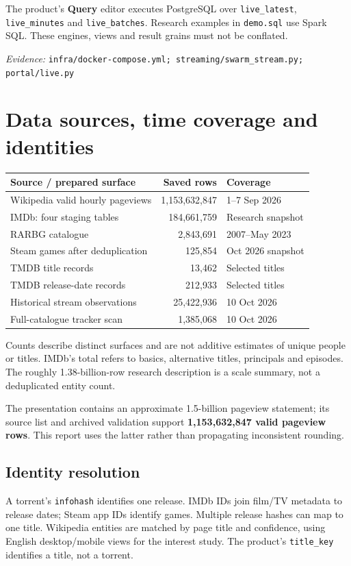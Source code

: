\documentclass[11pt,a4paper]{article}
\newcommand{\code}[1]{{\small\nolinkurl{#1}}}
\newcommand{\source}[1]{{\footnotesize\textit{Evidence:} \code{#1}\par}}
\newcommand{\chapterpage}[1]{\clearpage\section{#1}}
\begin{document}
The product's \textbf{Query} editor executes PostgreSQL over
\code{live_latest}, \code{live_minutes} and \code{live_batches}.
Research examples in \code{demo.sql} use Spark SQL. These engines, views
and result grains must not be conflated.

\source{infra/docker-compose.yml; streaming/swarm_stream.py; portal/live.py}

\chapterpage{Data sources, time coverage and identities}
\begin{tabularx}{\linewidth}{@{}Yrl@{}}
\toprule
\textbf{Source / prepared surface} & \textbf{Saved rows} & \textbf{Coverage}\\
\midrule
Wikipedia valid hourly pageviews & 1,153,632,847 & 1--7 Sep 2026\\
IMDb: four staging tables & 184,661,759 & Research snapshot\\
RARBG catalogue & 2,843,691 & 2007--May 2023\\
Steam games after deduplication & 125,854 & Oct 2026 snapshot\\
TMDB title records & 13,462 & Selected titles\\
TMDB release-date records & 212,933 & Selected titles\\
Historical stream observations & 25,422,936 & 10 Oct 2026\\
Full-catalogue tracker scan & 1,385,068 & 10 Oct 2026\\
\bottomrule
\end{tabularx}

Counts describe distinct surfaces and are not additive estimates of unique
people or titles. IMDb's total refers to basics, alternative titles,
principals and episodes. The roughly 1.38-billion-row research description
is a scale summary, not a deduplicated entity count.

The presentation contains an approximate 1.5-billion pageview statement;
its source list and archived validation support
\textbf{1,153,632,847 valid pageview rows}. This report uses the latter
rather than propagating inconsistent rounding.

\subsection{Identity resolution}
A torrent's \code{infohash} identifies one release. IMDb IDs join film/TV
metadata to release dates; Steam app IDs identify games. Multiple release
hashes can map to one title. Wikipedia entities are matched by page title
and confidence, using English desktop/mobile views for the interest study.
The product's \code{title_key} identifies a title, not a torrent.
\end{document}
